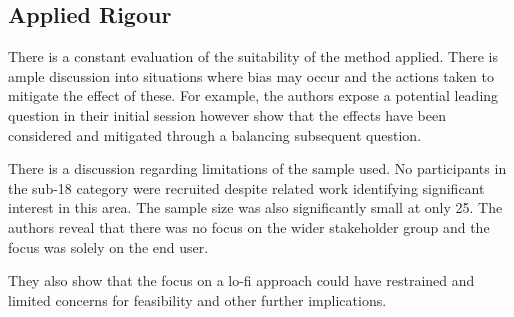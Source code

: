 \subsection{Applied Rigour}

There is a constant evaluation of the suitability of the method applied. There is ample discussion into situations where bias may occur and the actions taken to mitigate the effect of these. For example, the authors expose a potential leading question in their initial session however show that the effects have been considered and mitigated through a balancing subsequent question. 

There is a discussion regarding limitations of the sample used. No participants in the sub-18 category were recruited despite related work identifying significant interest in this area. The sample size was also significantly small at only 25. The authors reveal that there was no focus on the wider stakeholder group and the focus was solely on the end user. 

They also show that the focus on a lo-fi approach could have restrained and limited concerns for feasibility and other further implications.

\newpage